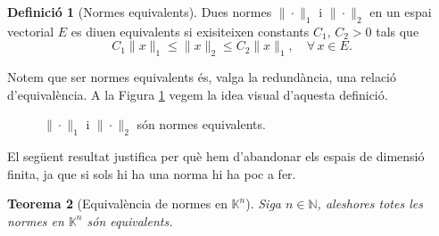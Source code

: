 \documentclass[12pt]{book}
\newtheorem{teorema}{Teorema}[chapter]
\theoremstyle{definition}
\newtheorem{defi}[teorema]{Definició}
\theoremstyle{nota}
\theoremstyle{exemple}
\begin{document}
\begin{defi}[Normes equivalents]
  Dues normes $\|\cdot\|_1$ i $\|\cdot\|_2$ en un espai vectorial $E$
  es diuen equivalents si exisiteixen constants $C_1,\, C_2 > 0$ tals
  que
  \[
    C_1 \|x\|_1 \leq \|x\|_2 \leq C_2 \|x\|_1, \quad \forall\, x \in E.
  \]
\end{defi}

Notem que ser normes equivalents és, valga la redundància, una relació
d'equivalència. A la Figura \ref{fig:normes-equiv} vegem la idea
visual d'aquesta definició.

\begin{figure}[htbp]
  \centering
  \caption{$\|\cdot\|_1$ i $\|\cdot\|_2$ són normes equivalents.}
  \label{fig:normes-equiv}
\end{figure}

El següent resultat justifica per què hem d'abandonar els espais de
dimensió finita, ja que si sols hi ha una norma hi ha poc a fer.

\begin{teorema}[Equivalència de normes en $\mathbb{K}^n$]
  Siga $n \in \mathbb{N}$, aleshores totes les normes en
  $\mathbb{K}^n$ són equivalents.
\end{teorema}
\end{document}
